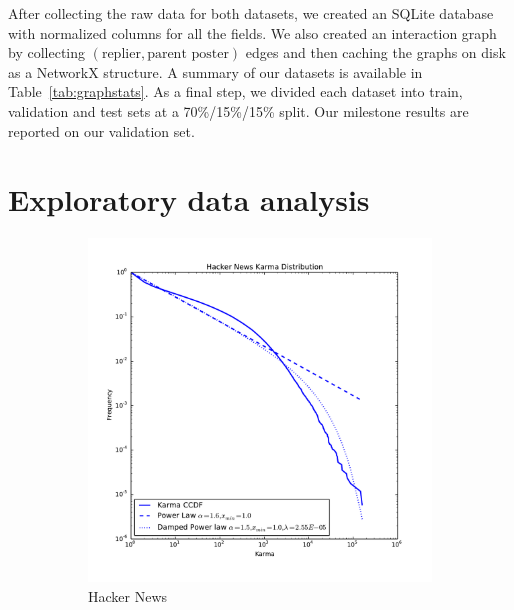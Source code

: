 \documentclass[10pt]{article}
\begin{document}
After collecting the raw data for both datasets, we created an SQLite database
with normalized columns for all the fields. We also created an interaction graph
by collecting $(\text{replier}, \text{parent poster})$ edges and then caching
the graphs on disk as a NetworkX structure. A summary of our datasets is
available in Table~\ref{tab:graphstats}. As a final step, we divided each dataset 
into train, validation and test sets at
a 70\%/15\%/15\% split. Our milestone results are reported on our validation
set.

\section{Exploratory data analysis}

\begin{figure}[h]
\centering
\begin{subfigure}{0.49\textwidth}
\centering
\includegraphics[width=\linewidth]{hn_karma_distribution}
\caption{Hacker News}
\label{fig:hnkarma}
\end{subfigure}%
\begin{subfigure}{0.49\textwidth}
\centering

\end{subfigure}
\end{figure}
\end{document}
